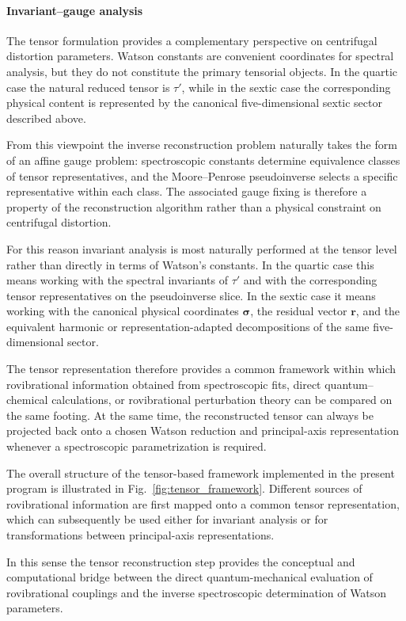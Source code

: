 \paragraph{Invariant--gauge analysis}

The tensor formulation provides a complementary perspective on
centrifugal distortion parameters. Watson constants are convenient
coordinates for spectral analysis, but they do not constitute the
primary tensorial objects. In the quartic case the natural reduced
tensor is $\tau'$, while in the sextic case the corresponding physical
content is represented by the canonical five-dimensional sextic sector
described above.

From this viewpoint the inverse reconstruction problem naturally takes
the form of an affine gauge problem: spectroscopic constants determine
equivalence classes of tensor representatives, and the Moore--Penrose
pseudoinverse selects a specific representative within each class.
The associated gauge fixing is therefore a property of the
reconstruction algorithm rather than a physical constraint on
centrifugal distortion.

For this reason invariant analysis is most naturally performed at the
tensor level rather than directly in terms of Watson's constants.
In the quartic case this means working with the spectral invariants of
$\tau'$ and with the corresponding tensor representatives on the
pseudoinverse slice. In the sextic case it means working with the
canonical physical coordinates $\boldsymbol\sigma$, the residual
vector $\mathbf r$, and the equivalent harmonic or
representation-adapted decompositions of the same five-dimensional
sector.

The tensor representation therefore provides a common framework within
which rovibrational information obtained from spectroscopic fits,
direct quantum--chemical calculations, or rovibrational perturbation
theory can be compared on the same footing. At the same time, the
reconstructed tensor can always be projected back onto a chosen
Watson reduction and principal-axis representation whenever a
spectroscopic parametrization is required.

The overall structure of the tensor-based framework implemented in the
present program is illustrated in Fig.~\ref{fig:tensor_framework}.
Different sources of rovibrational information are first mapped onto a
common tensor representation, which can subsequently be used either for
invariant analysis or for transformations between principal-axis
representations.

In this sense the tensor reconstruction step provides the conceptual
and computational bridge between the direct quantum-mechanical
evaluation of rovibrational couplings and the inverse spectroscopic
determination of Watson parameters.
